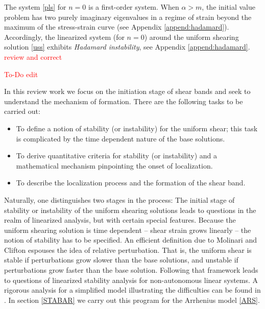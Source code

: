 \documentclass[a4paper,11pt]{article}
\newcommand{\tcr}{\textcolor{red}}
\theoremstyle{remark}
\begin{document}
The system \eqref{pls} for $n=0$ is a first-order system. When $\alpha > m$, the initial value problem  has two purely imaginary eigenvalues in a regime 
of strain beyond the maximum of the stress-strain curve (see Appendix \ref{append:hadamard}). 
Accordingly, the linearized system (for $n=0$) around the uniform shearing solution \eqref{uss} exhibits {\it Hadamard instability}, see Appendix \ref{append:hadamard}.
\tcr{review and correct}


\tcr{To-Do  edit}

\bigskip

In this review work we focus on the initiation stage of shear bands and seek to understand the
mechanism of formation.
There are the following tasks to be carried out:
\begin{itemize}
\item To define a notion of stability (or instability) for the uniform shear; this task is complicated
by the time dependent nature of the base solutions.
\item To derive quantitative criteria for stability (or instability) and a mathematical mechanism pinpointing the onset of localization.
\item To describe the localization process and the formation of the shear band.
\end{itemize}

Naturally, one distinguishes two stages in the process: The initial stage of stability or instability 
of the uniform shearing solutions leads to questions in the realm of linearized analysis, but with
certain special features. Because the uniform shearing solution
is time dependent -- shear strain grows linearly -- the notion of stability has to be specified. An efficient definition due to
Molinari and Clifton \cite{MC87,FM87} espouses the idea of relative perturbation. That is, the uniform shear
is stable if perturbations grow slower than the base solutions, and unstable if perturbations grow
faster than the base solution. Following that framework leads to questions of linearized stability analysis 
for non-autonomous linear systems.
A rigorous analysis for a simplified model illustrating the difficulties can be found in \cite{Tzavaras92}.
In section \ref{STABAR}  we carry out this program for the Arrhenius model \eqref{ARS}.
\end{document}
